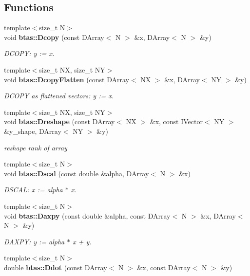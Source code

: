 \subsection*{Functions}
\begin{DoxyCompactItemize}
\item 
{\footnotesize template$<$size\-\_\-t N$>$ }\\void {\bf btas\-::\-Dcopy} (const D\-Array$<$ N $>$ \&x, D\-Array$<$ N $>$ \&y)
\begin{DoxyCompactList}\small\item\em D\-C\-O\-P\-Y\-: y \-:= x. \end{DoxyCompactList}\item 
{\footnotesize template$<$size\-\_\-t N\-X, size\-\_\-t N\-Y$>$ }\\void {\bf btas\-::\-Dcopy\-Flatten} (const D\-Array$<$ N\-X $>$ \&x, D\-Array$<$ N\-Y $>$ \&y)
\begin{DoxyCompactList}\small\item\em D\-C\-O\-P\-Y as flattened vectors\-: y \-:= x. \end{DoxyCompactList}\item 
{\footnotesize template$<$size\-\_\-t N\-X, size\-\_\-t N\-Y$>$ }\\void {\bf btas\-::\-Dreshape} (const D\-Array$<$ N\-X $>$ \&x, const I\-Vector$<$ N\-Y $>$ \&y\-\_\-shape, D\-Array$<$ N\-Y $>$ \&y)
\begin{DoxyCompactList}\small\item\em reshape rank of array \end{DoxyCompactList}\item 
{\footnotesize template$<$size\-\_\-t N$>$ }\\void {\bf btas\-::\-Dscal} (const double \&alpha, D\-Array$<$ N $>$ \&x)
\begin{DoxyCompactList}\small\item\em D\-S\-C\-A\-L\-: x \-:= alpha $\ast$ x. \end{DoxyCompactList}\item 
{\footnotesize template$<$size\-\_\-t N$>$ }\\void {\bf btas\-::\-Daxpy} (const double \&alpha, const D\-Array$<$ N $>$ \&x, D\-Array$<$ N $>$ \&y)
\begin{DoxyCompactList}\small\item\em D\-A\-X\-P\-Y\-: y \-:= alpha $\ast$ x + y. \end{DoxyCompactList}\item 
{\footnotesize template$<$size\-\_\-t N$>$ }\\double {\bf btas\-::\-Ddot} (const D\-Array$<$ N $>$ \&x, const D\-Array$<$ N $>$ \&y)

\end{DoxyCompactItemize}
